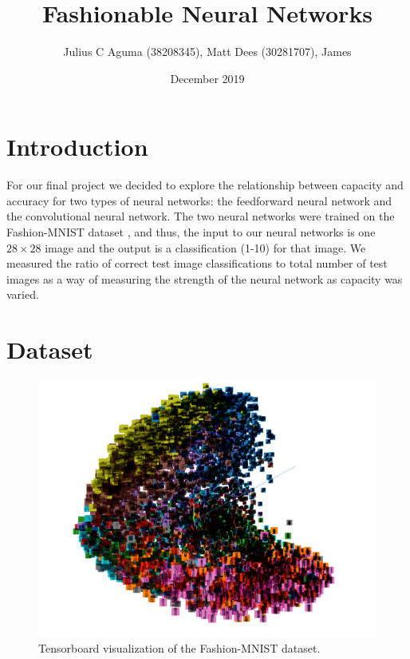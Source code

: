 \documentclass[titlepage]{article}
\title{Fashionable Neural Networks}
\author{Julius C Aguma (38208345), Matt Dees (30281707), James}
\date{December 2019}
\begin{document}
\maketitle

\section{Introduction}

\par For our final project we decided to explore the relationship between capacity and accuracy for two types of neural networks: the feedforward neural network and the convolutional neural network. The two neural networks were trained on the Fashion-MNIST dataset \cite{fashionmnist}, and thus, the input to our neural networks is one $28 \times 28$ image and the output is a classification (1-10) for that image. We measured the ratio of correct test image classifications to total number of test images as a way of measuring the strength of the neural network as capacity was varied. 

\section{Dataset}

\begin{figure}[h!]
\centering
  \includegraphics[scale=.25]{tensorboard_pca.png}
  \caption{Tensorboard visualization of the Fashion-MNIST dataset.}
  \label{fig:tensorboard_pca}
\end{figure}
\end{document}
